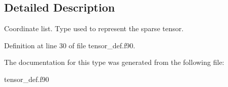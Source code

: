 \subsection{Detailed Description}
Coordinate list. Type used to represent the sparse tensor. 

Definition at line 30 of file tensor\+\_\+def.\+f90.



The documentation for this type was generated from the following file\+:\begin{DoxyCompactItemize}
\item 
tensor\+\_\+def.\+f90\end{DoxyCompactItemize}
